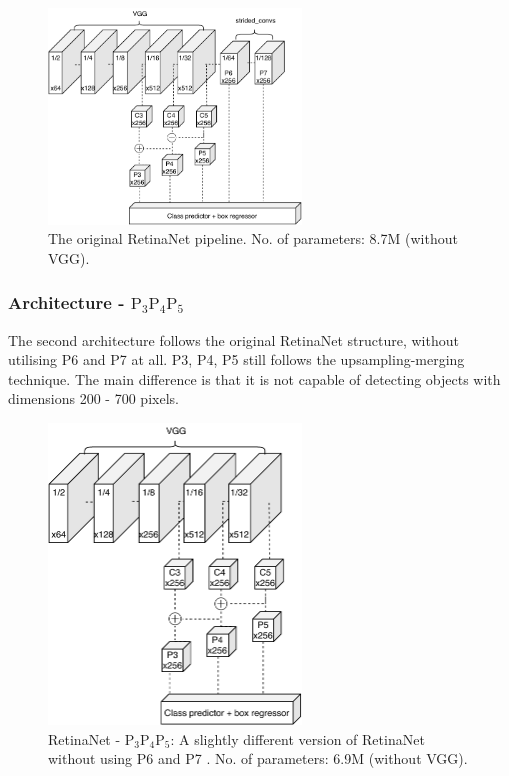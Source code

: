 \begin{figure}[!htb]
  \centering
  \includegraphics[width=0.6\textwidth]{figures/ch3/fig3.pdf}
  \caption{The original RetinaNet pipeline. No. of parameters: 8.7M (without VGG).}
  \label{fig3}
\end{figure} 

\subsubsection{Architecture - $\text{P}_3\text{P}_4\text{P}_5$}\label{arch_2}
The second architecture follows the original RetinaNet structure, without utilising P6 and P7 at all. P3, P4, P5 still follows the upsampling-merging technique. The main difference is that it is not capable of detecting objects with dimensions 200 - 700 pixels.

\begin{figure}[!htb]
  \centering
  \includegraphics[width=0.6\textwidth]{figures/ch3/fig4.pdf}
  \caption{RetinaNet - $\text{P}_3\text{P}_4\text{P}_5$: A slightly different version of RetinaNet without using P6 and P7 . No. of parameters: 6.9M (without VGG).}
  \label{fig4}
\end{figure} 

